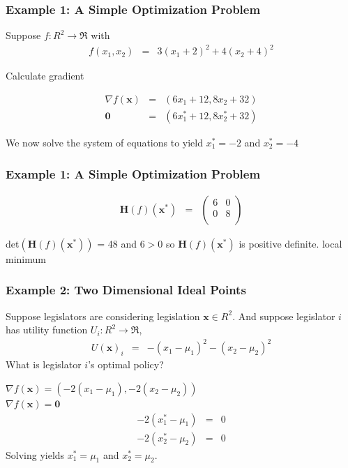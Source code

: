 \documentclass{beamer}
\numberwithin{equation}{section}
\begin{document}
\begin{frame}
\frametitle{Example 1: A Simple Optimization Problem}

Suppose $f:R^{2} \rightarrow \Re$ with 
\begin{eqnarray}
f(x_{1}, x_{2}) & = & 3(x_1 + 2)^2  + 4(x_{2}  + 4)^2 \nonumber 
\end{eqnarray} \pause

Calculate gradient \pause

\begin{eqnarray}
\nabla f(\boldsymbol{x}) & = & (6 x_{1} + 12 , 8x_{2} + 32 ) \nonumber \\
\boldsymbol{0} & = & (6 x_{1}^{*} + 12 , 8x_{2}^{*} + 32 ) \nonumber 
\end{eqnarray} \pause

We now solve the system of equations to yield
$x_{1}^{*}  = - 2$ and $x_{2}^{*}  = -4 $ 

\end{frame}



\begin{frame}
\frametitle{Example 1: A Simple Optimization Problem}

\begin{eqnarray}
\textbf{H}(f)(\boldsymbol{x}^{*}) & = & \begin{pmatrix}
6 & 0 \\
0 & 8 \\
\end{pmatrix}\nonumber 
\end{eqnarray} \pause

det$(\textbf{H}(f)(\boldsymbol{x}^{*}))$ = 48 and $6>0$ so $\textbf{H}(f)(\boldsymbol{x}^{*})$ is positive definite. \alert{local minimum}

\end{frame}





\begin{frame}
\frametitle{Example 2: Two Dimensional Ideal Points}
Suppose legislators are considering legislation $\boldsymbol{x} \in R^{2}$.  And suppose legislator $i$ has utility function $U_{i}: R^{2} \rightarrow \Re$, \pause
\begin{eqnarray}
U(\boldsymbol{x})_{i} & = & - (x_{1} - \mu_{1})^2 - (x_{2} - \mu_{2})^2 \nonumber 
\end{eqnarray} \pause
What is legislator $i$'s optimal policy? \pause

$\nabla f(\boldsymbol{x}) = ( -2 (x_{1} - \mu_{1} ) , -2 (x_{2} - \mu_{2} )  )$\\
$\nabla f(\boldsymbol{x}) = \boldsymbol{0} $ \pause
\begin{eqnarray}
- 2(x_{1}^{*} - \mu_{1} ) & = & 0 \nonumber \\
- 2(x_{2}^{*} - \mu_{2} ) & = & 0 \nonumber 
\end{eqnarray}  \pause
Solving yields $x_{1}^{*} = \mu_{1}$ and $x_{2}^{*} = \mu_{2}$.  

\end{frame}
\end{document}
